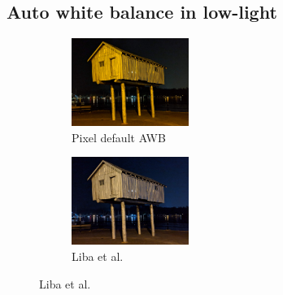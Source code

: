 \documentclass{sig-alternate}
\begin{document}


\subsection{Auto white balance in low-light}
\label{sec:autoWhiteBal}

\begin{figure}
\centering
\begin{subfigure}{9pc}
\centering
\includegraphics[width=9pc]{figures/0GMA_20180814_233948_174_qc.jpg}
\caption{Pixel default AWB}
\label{fig:whitebalance:default}
\end{subfigure}
\begin{subfigure}{9pc}
\centering
\includegraphics[width=9pc]{figures/0GMA_20180814_233948_174_gcam.jpg}
\caption{Liba et al.}
\label{fig:whitebalance:liba}
\end{subfigure}


\end{figure}
\end{document}
